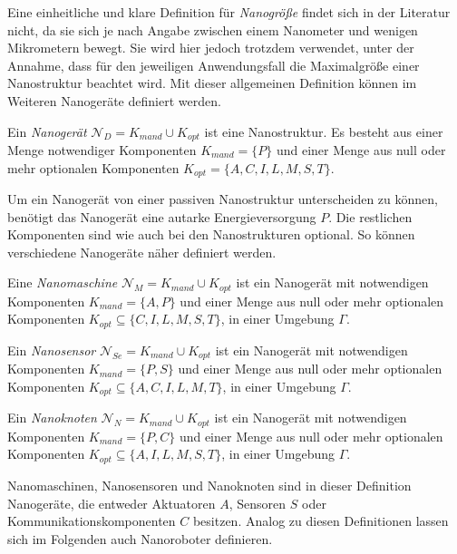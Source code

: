 Eine einheitliche und klare Definition für \emph{Nanogröße} findet sich in der Literatur nicht, da sie sich je nach Angabe zwischen einem Nanometer und wenigen Mikrometern bewegt. 
Sie wird hier jedoch trotzdem verwendet, unter der Annahme, dass für den jeweiligen Anwendungsfall die Maximalgröße einer Nanostruktur beachtet wird.
Mit dieser allgemeinen Definition können im Weiteren Nanogeräte definiert werden.

\begin{definition}
	Ein \emph{Nanogerät} $\mathcal{N}_D = K_{mand} \cup K_{opt}$ ist eine Nanostruktur. Es besteht aus einer Menge notwendiger Komponenten $K_{mand} = \{P\}$ und einer Menge aus null oder mehr optionalen Komponenten $K_{opt} = \{A,C,I,L,M,S,T\}$.
\end{definition}

Um ein Nanogerät von einer passiven Nanostruktur unterscheiden zu können, benötigt das Nanogerät eine autarke Energieversorgung $P$. Die restlichen Komponenten sind wie auch bei den Nanostrukturen optional.
So können verschiedene Nanogeräte näher definiert werden.

\begin{definition}
	Eine \emph{Nanomaschine} $\mathcal{N}_M = K_{mand} \cup K_{opt}$ ist ein Nanogerät mit notwendigen Komponenten $K_{mand} = \{A,P\}$ und einer Menge aus null oder mehr optionalen Komponenten $K_{opt} \subseteq \{C,I,L,M,S,T\}$, in einer Umgebung $\Gamma$.
\end{definition}

\begin{definition}
	Ein \emph{Nanosensor} $\mathcal{N}_{Se} = K_{mand} \cup K_{opt}$ ist ein Nanogerät mit notwendigen Komponenten $K_{mand} = \{P,S\}$ und einer Menge aus null oder mehr optionalen Komponenten $K_{opt} \subseteq \{A,C,I,L,M,T\}$, in einer Umgebung $\Gamma$.
\end{definition}

\begin{definition}
	Ein \emph{Nanoknoten} $\mathcal{N}_{N} = K_{mand} \cup K_{opt}$ ist ein Nanogerät mit notwendigen Komponenten $K_{mand} = \{P,C\}$ und einer Menge aus null oder mehr optionalen Komponenten $K_{opt} \subseteq \{A,I,L,M,S,T\}$, in einer Umgebung $\Gamma$.
\end{definition}

Nanomaschinen, Nanosensoren und Nanoknoten sind in dieser Definition Nanogeräte, die entweder Aktuatoren $A$, Sensoren $S$ oder Kommunikationskomponenten $C$ besitzen. Analog zu diesen Definitionen lassen sich im Folgenden auch Nanoroboter definieren.

